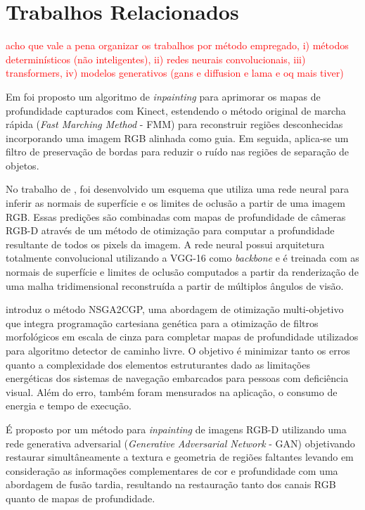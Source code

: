 \chapter{Trabalhos Relacionados}

\textcolor{red}{acho que vale a pena organizar os trabalhos por método empregado, i) métodos determinísticos (não inteligentes), ii) redes neurais convolucionais, iii) transformers, iv) modelos generativos (gans e diffusion e lama e oq mais tiver)}

Em  foi proposto um algoritmo de \textit{inpainting} para aprimorar os mapas de profundidade capturados com Kinect, estendendo o método original de marcha rápida (\textit{Fast Marching Method} - FMM) para reconstruir regiões desconhecidas incorporando uma imagem RGB alinhada como guia. Em seguida, aplica-se um filtro de preservação de bordas para reduzir o ruído nas regiões de separação de objetos. 

No trabalho de , foi desenvolvido um esquema que utiliza uma rede neural para inferir as normais de superfície e os limites de oclusão a partir de uma imagem RGB. Essas predições são combinadas com mapas de profundidade de câmeras RGB-D através de um método de otimização para computar a profundidade resultante de todos os pixels da imagem. A rede neural possui arquitetura totalmente convolucional utilizando a VGG-16 como \textit{backbone} e é treinada com as normais de superfície e limites de oclusão computados a partir da renderização de uma malha tridimensional reconstruída a partir de múltiplos ângulos de visão. 
 

 introduz o método NSGA2CGP, uma abordagem de otimização multi-objetivo que integra programação cartesiana genética para a otimização de filtros morfológicos em escala de cinza para completar mapas de profundidade utilizados para algoritmo detector de caminho livre. O objetivo é minimizar tanto os erros quanto a complexidade dos elementos estruturantes dado as limitações energéticas dos sistemas de navegação embarcados para pessoas com deficiência visual. Além do erro, também foram mensurados na aplicação, o consumo de energia e tempo de execução. 


É proposto por  um método para \textit{inpainting} de imagens RGB-D utilizando uma rede generativa adversarial (\textit{Generative Adversarial Network} - GAN) objetivando restaurar simultâneamente a textura e geometria de regiões faltantes levando em consideração as informações complementares de cor e profundidade com uma abordagem de fusão tardia, resultando na restauração tanto dos canais RGB quanto de mapas de profundidade.

